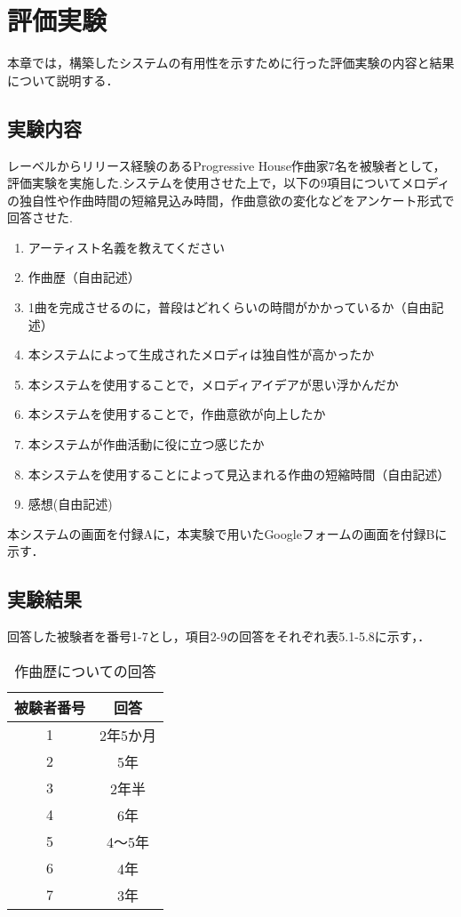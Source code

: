 \chapter{評価実験}
本章では，構築したシステムの有用性を示すために行った評価実験の内容と結果について説明する．

\section{実験内容}
レーベルからリリース経験のあるProgressive House作曲家7名を被験者として，評価実験を実施した.システムを使用させた上で，以下の9項目についてメロディの独自性や作曲時間の短縮見込み時間，作曲意欲の変化などをアンケート形式で回答させた.
\begin{enumerate}
  \item アーティスト名義を教えてください
  \item 作曲歴（自由記述）
  \item 1曲を完成させるのに，普段はどれくらいの時間がかかっているか（自由記述）
  \item 本システムによって生成されたメロディは独自性が高かったか
  \item 本システムを使用することで，メロディアイデアが思い浮かんだか
  \item 本システムを使用することで，作曲意欲が向上したか
  \item 本システムが作曲活動に役に立つ感じたか
  \item 本システムを使用することによって見込まれる作曲の短縮時間（自由記述）
  \item 感想(自由記述)
\end{enumerate}
本システムの画面を付録Aに，本実験で用いたGoogleフォームの画面を付録Bに示す．

\section{実験結果}
回答した被験者を番号1-7とし，項目2-9の回答をそれぞれ表5.1-5.8に示す，．

\begin{table}[htbp]
  \begin{center}
    \caption{作曲歴についての回答}
    \begin{tabular}{|c|c|}
      \hline
      被験者番号 & 回答 \rule[-3mm]{0mm}{8mm}\\ \hline \hline
      1 & 2年5か月\rule[-3mm]{0mm}{8mm} \\ \hline
      2 & 5年\rule[-3mm]{0mm}{8mm} \\ \hline
      3 & 2年半\rule[-3mm]{0mm}{8mm} \\ \hline
      4 & 6年\rule[-3mm]{0mm}{8mm} \\ \hline
      5 & 4〜5年\rule[-3mm]{0mm}{8mm} \\ \hline
      6 & 4年\rule[-3mm]{0mm}{8mm} \\ \hline
      7 & 3年\rule[-3mm]{0mm}{8mm} \\ \hline
    \end{tabular}
  \end{center}
\end{table}

